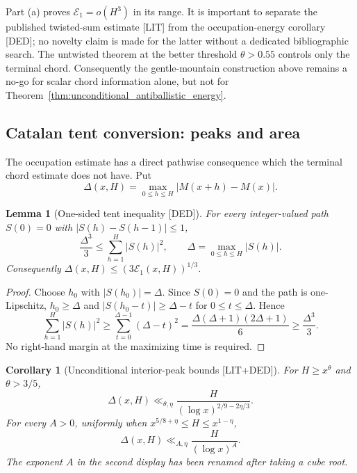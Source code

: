 \documentclass[11pt]{amsart}
\numberwithin{equation}{section}
\theoremstyle{plain}
\newtheorem{lemma}[theorem]{Lemma}
\newtheorem{corollary}[theorem]{Corollary}
\theoremstyle{definition}
\theoremstyle{remark}
\newcommand{\Mert}{M}
\begin{document}
Part (a) proves $\mathcal E_1=o(H^3)$ in its range.  It is important to
separate the published twisted-sum estimate [LIT] from the occupation-energy
corollary [DED]; no novelty claim is made for the latter without a dedicated
bibliographic search.  The untwisted theorem at the better threshold
$\theta>0.55$ controls only the terminal chord.  Consequently the
gentle-mountain construction above remains a no-go for scalar chord
information alone, but not for Theorem~\ref{thm:unconditional_antiballistic_energy}.

\subsection{Catalan tent conversion: peaks and area}
\label{subsec:catalan_tent_conversion}

The occupation estimate has a direct pathwise consequence which the terminal
chord estimate does not have.  Put
\begin{equation}
 \Delta(x,H)=\max_{0\leq h\leq H}|\Mert(x+h)-\Mert(x)|.
\end{equation}

\begin{lemma}[One-sided tent inequality \textnormal{[DED]}]
\label{lem:one_sided_tent}
For every integer-valued path $S(0)=0$ with
$|S(h)-S(h-1)|\leq1$,
\begin{equation}
 \boxed{\quad
 \frac{\Delta^3}{3}\leq
 \sum_{h=1}^{H}|S(h)|^2,
 \qquad
 \Delta=\max_{0\leq h\leq H}|S(h)|.
 \quad}
\label{eq:one_sided_tent}
\end{equation}
Consequently
$\Delta(x,H)\leq(3\mathcal E_1(x,H))^{1/3}$.
\end{lemma}

\begin{proof}
Choose $h_0$ with $|S(h_0)|=\Delta$.  Since $S(0)=0$ and the path is
one-Lipschitz, $h_0\geq\Delta$ and
$|S(h_0-t)|\geq\Delta-t$ for $0\leq t\leq\Delta$.  Hence
\begin{equation}
 \sum_{h=1}^{H}|S(h)|^2
 \geq\sum_{t=0}^{\Delta-1}(\Delta-t)^2
 =\frac{\Delta(\Delta+1)(2\Delta+1)}6
 \geq\frac{\Delta^3}{3}.
\end{equation}
No right-hand margin at the maximizing time is required.
\end{proof}

\begin{corollary}[Unconditional interior-peak bounds
\textnormal{[LIT+DED]}]
\label{cor:unconditional_peak_bounds}
For $H\geq x^\theta$ and $\theta>3/5$,
\begin{equation}
 \boxed{\quad
 \Delta(x,H)
 \ll_{\theta,\eta}
 \frac{H}{(\log x)^{2/9-2\eta/3}}.
 \quad}
\label{eq:mt_interior_peak}
\end{equation}
For every $A>0$, uniformly when
$x^{5/8+\eta}\leq H\leq x^{1-\eta}$,
\begin{equation}
 \boxed{\quad
 \Delta(x,H)\ll_{A,\eta}\frac{H}{(\log x)^A}.
 \quad}
\label{eq:higher_uniformity_interior_peak}
\end{equation}
The exponent $A$ in the second display has been renamed after taking a cube
root.
\end{corollary}
\end{document}
